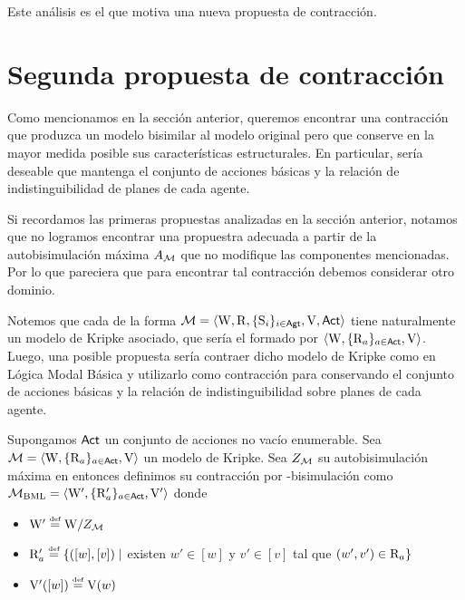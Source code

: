 Este análisis es el que motiva una nueva propuesta de contracción.

\section{Segunda propuesta de contracción}

Como mencionamos en la sección anterior, queremos encontrar una contracción que produzca un modelo bisimilar al modelo original pero que conserve 
en la mayor medida posible sus características estructurales. En particular, sería deseable que mantenga el conjunto de acciones básicas y la relación de 
indistinguibilidad de planes de cada agente.

Si recordamos las primeras propuestas analizadas en la sección anterior, notamos que no logramos encontrar una propuestra adecuada a partir de 
la autobisimulación máxima $A_{\mathcal{M}}$ que no modifique las componentes mencionadas. Por lo que pareciera que para encontrar tal contracción 
debemos considerar otro dominio.  

Notemos que cada \ults de la forma $\mathcal{M}=\langle \mathrm{W},\mathrm{R},\{ \mathrm{S}_i \}_{i \in {\rm \sf Agt}},\mathrm{V},{\rm \sf Act} \rangle$ tiene naturalmente un modelo de Kripke asociado, 
que sería el formado por $\langle \mathrm{W},\{\mathrm{R}_a\}_{a\in{\rm \sf Act}},\mathrm{V} \rangle$. Luego, una posible propuesta sería contraer dicho modelo de Kripke como en 
Lógica Modal Básica y utilizarlo como contracción para \KHilogic conservando el conjunto de acciones básicas y la relación de indistinguibilidad 
sobre planes de cada agente.

\begin{definicion}
    Supongamos ${\rm \sf Act}$ un conjunto de acciones no vacío enumerable.
    Sea $\mathcal{M} = \langle \mathrm{W},\{\mathrm{R}_a\}_{a\in{\rm \sf Act}},\mathrm{V} \rangle$ un modelo de Kripke. Sea $Z_{\mathcal{M}}$ su autobisimulación máxima en \bml entonces definimos su contracción por \bml-bisimulación como $\mathcal{M}_{\mathrm{BML}} = \langle \mathrm{W}',\{\mathrm{R}'_a\}_{a\in{\rm \sf Act}},\mathrm{V}' \rangle$ donde
    \begin{center}
        \begin{itemize}
            \item $\W' \eqdef \W /Z_\modults$
            \item $\R_a' \eqdef \{([w],[v]) \mid$ existen $w' \in [w]$ y $v' \in [v]$ tal que $(w',v') \in \mathrm{R}_a \}$
            \item $\V'([w]) \eqdef \V(w)$
        \end{itemize}
    \end{center} 
\end{definicion}

